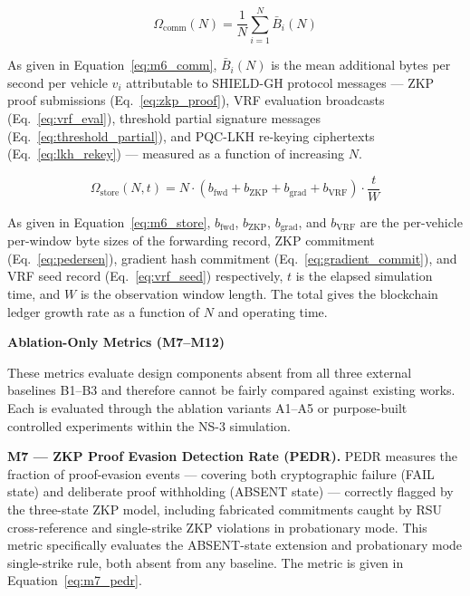 \documentclass[12pt, a4paper]{report}
\newcommand{\mypar}{\vspace{0.8em}\noindent}
\begin{document}
\begin{equation}
\label{eq:m6_comm}
\Omega_{\text{comm}}(N) =
\frac{1}{N} \sum_{i=1}^{N} \bar{B}_i(N)
\end{equation}

As given in Equation~\eqref{eq:m6_comm}, $\bar{B}_i(N)$ is the mean
additional bytes per second per vehicle $v_i$ attributable to SHIELD-GH
protocol messages — ZKP proof submissions (Eq.~\eqref{eq:zkp_proof}),
VRF evaluation broadcasts (Eq.~\eqref{eq:vrf_eval}), threshold partial
signature messages (Eq.~\eqref{eq:threshold_partial}), and PQC-LKH
re-keying ciphertexts (Eq.~\eqref{eq:lkh_rekey}) — measured as a
function of increasing $N$.

\begin{equation}
\label{eq:m6_store}
\Omega_{\text{store}}(N, t) =
N \cdot
\left(
b_{\text{fwd}} + b_{\text{ZKP}} + b_{\text{grad}} + b_{\text{VRF}}
\right)
\cdot \frac{t}{W}
\end{equation}

As given in Equation~\eqref{eq:m6_store}, $b_{\text{fwd}}$,
$b_{\text{ZKP}}$, $b_{\text{grad}}$, and $b_{\text{VRF}}$ are the
per-vehicle per-window byte sizes of the forwarding record, ZKP
commitment (Eq.~\eqref{eq:pedersen}), gradient hash commitment
(Eq.~\eqref{eq:gradient_commit}), and VRF seed record
(Eq.~\eqref{eq:vrf_seed}) respectively, $t$ is the elapsed simulation
time, and $W$ is the observation window length. The total gives the
blockchain ledger growth rate as a function of $N$ and operating time.

\vspace{0.6em}
\noindent\textbf{Ablation-Only Metrics (M7--M12)}

These metrics evaluate design components absent from all three external
baselines B1--B3 and therefore cannot be fairly compared against existing
works. Each is evaluated through the ablation variants A1--A5 or
purpose-built controlled experiments within the NS-3 simulation.

\mypar
\textbf{M7 --- ZKP Proof Evasion Detection Rate (PEDR).}
PEDR measures the fraction of proof-evasion events — covering both
cryptographic failure (FAIL state) and deliberate proof withholding
(ABSENT state) — correctly flagged by the three-state ZKP model,
including fabricated commitments caught by RSU cross-reference and
single-strike ZKP violations in probationary mode. This metric
specifically evaluates the ABSENT-state extension and probationary
mode single-strike rule, both absent from any baseline. The metric
is given in Equation~\eqref{eq:m7_pedr}.
\end{document}
